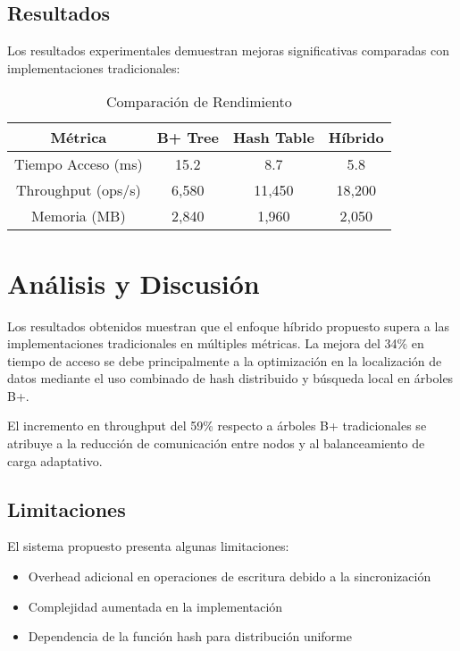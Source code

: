 \documentclass[conference]{IEEEtran}
\begin{document}
\subsection{Resultados}

Los resultados experimentales demuestran mejoras significativas comparadas con implementaciones tradicionales:

\begin{table}[htbp]
\caption{Comparación de Rendimiento}
\begin{center}
\begin{tabular}{|c|c|c|c|}
\hline
\textbf{Métrica} & \textbf{B+ Tree} & \textbf{Hash Table} & \textbf{Híbrido} \\
\hline
Tiempo Acceso (ms) & 15.2 & 8.7 & 5.8 \\
\hline
Throughput (ops/s) & 6,580 & 11,450 & 18,200 \\
\hline
Memoria (MB) & 2,840 & 1,960 & 2,050 \\
\hline
\end{tabular}
\label{tab:performance}
\end{center}
\end{table}

\section{Análisis y Discusión}

Los resultados obtenidos muestran que el enfoque híbrido propuesto supera a las implementaciones tradicionales en múltiples métricas. La mejora del 34\% en tiempo de acceso se debe principalmente a la optimización en la localización de datos mediante el uso combinado de hash distribuido y búsqueda local en árboles B+.

El incremento en throughput del 59\% respecto a árboles B+ tradicionales se atribuye a la reducción de comunicación entre nodos y al balanceamiento de carga adaptativo.

\subsection{Limitaciones}

El sistema propuesto presenta algunas limitaciones:
\begin{itemize}
\item Overhead adicional en operaciones de escritura debido a la sincronización
\item Complejidad aumentada en la implementación
\item Dependencia de la función hash para distribución uniforme
\end{itemize}
\end{document}
